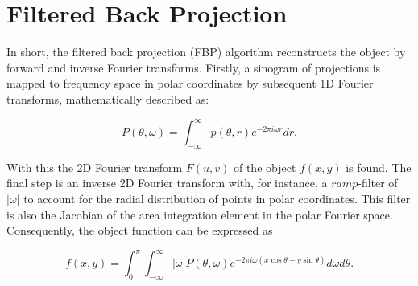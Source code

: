 \section{Filtered Back Projection}
In short, the filtered back projection (FBP) algorithm reconstructs the object by forward and inverse Fourier transforms.
Firstly, a sinogram of projections is mapped to frequency space in polar coordinates by subsequent 1D Fourier transforms, mathematically described as:

\begin{equation}\label{eq:FBP_1}
    P(\theta, \omega) = \int_{-\infty}^{\infty} p(\theta,r)e^{-2\pi i\omega r} dr.
\end{equation}

With this the 2D Fourier transform $F(u,v)$ of the object $f(x,y)$ is found.
The final step is an inverse 2D Fourier transform with, for instance, a $ramp$-filter of $|\omega|$ to account for the radial distribution of points in polar coordinates.
This filter is also the Jacobian of the area integration element in the polar Fourier space.
Consequently, the object function can be expressed as

\begin{equation}
    f(x,y) = \int_{0}^{\pi} \int_{-\infty}^{\infty} \left|\omega\right| P(\theta,\omega)e^{-2\pi i\omega (x\cos\theta - y\sin\theta)} d\omega d\theta.
\end{equation}







